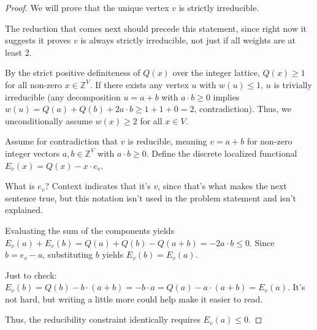 \documentclass[12pt]{article}
\newcommand{\review}[1]{\begin{reviewbox}#1\end{reviewbox}}
\begin{document}
\begin{proof}
We will prove that the unique vertex $v$ is strictly irreducible.
\review{The reduction that comes next should precede this statement, since right now it suggests it proves $v$ is always strictly irreducible, not just if all weights are at least $2$.}
By the strict positive definiteness of $Q(x)$ over the integer lattice, $Q(x) \ge 1$ for all non-zero $x \in \mathbb{Z}^V$. If there exists any vertex $u$ with $w(u) \le 1$, $u$ is trivially irreducible (any decomposition $u = a+b$ with $a \cdot b \ge 0$ implies $w(u) = Q(a) + Q(b) + 2a \cdot b \ge 1 + 1 + 0 = 2$, contradiction). Thus, we unconditionally assume $w(x) \ge 2$ for all $x \in V$.

Assume for contradiction that $v$ is reducible, meaning $v = a + b$ for non-zero integer vectors $a, b \in \mathbb{Z}^V$ with $a \cdot b \ge 0$.
Define the discrete localized functional $E_v(x) = Q(x) - x \cdot e_v$. 
\review{What is $e_v$? Context indicates that it's $v$, since that's what makes the next sentence true, but this notation isn't used in the problem statement and isn't explained.}
Evaluating the sum of the components yields $E_v(a) + E_v(b) = Q(a) + Q(b) - Q(a+b) = -2a \cdot b \le 0$. 
Since $b = e_v - a$, substituting $b$ yields $E_v(b) = E_v(a)$. 
\review{Just to check: $E_v(b) = Q(b) - b\cdot (a+b) = - b \cdot a = Q(a) - a \cdot (a+b) = E_v(a)$. It's not hard, but writing a little more could help make it easier to read.}
Thus, the reducibility constraint identically requires $E_v(a) \le 0$.


\end{proof}
\end{document}
